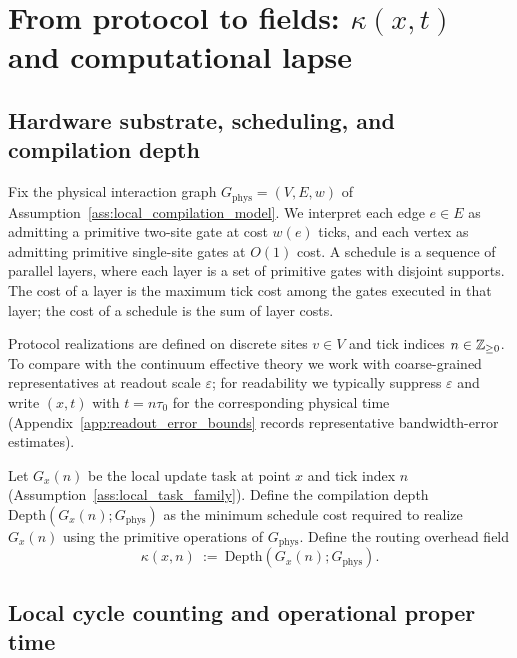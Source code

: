 \section{\texorpdfstring{From protocol to fields: $\kappa(x,t)$ and computational lapse}{From protocol to fields: kappa(x,t) and computational lapse}}
\label{sec:protocol_dictionary}

\subsection{Hardware substrate, scheduling, and compilation depth}
\label{subsec:hardware_depth}

Fix the physical interaction graph $G_{\mathrm{phys}}=(V,E,w)$ of Assumption~\ref{ass:local_compilation_model}.
We interpret each edge $e\in E$ as admitting a primitive two-site gate at cost $w(e)$ ticks, and each vertex as admitting primitive single-site gates at $O(1)$ cost.
A schedule is a sequence of parallel layers, where each layer is a set of primitive gates with disjoint supports.
The cost of a layer is the maximum tick cost among the gates executed in that layer; the cost of a schedule is the sum of layer costs.
\par
\noindent Protocol realizations are defined on discrete sites $v\in V$ and tick indices $n\in\mathbb{Z}_{\ge 0}$.
To compare with the continuum effective theory we work with coarse-grained representatives at readout scale $\varepsilon$; for readability we typically suppress $\varepsilon$ and write $(x,t)$ with $t=n\tau_0$ for the corresponding physical time (Appendix~\ref{app:readout_error_bounds} records representative bandwidth-error estimates).

\begin{definition}
\label{def:compilation_depth}
Let $G_x(n)$ be the local update task at point $x$ and tick index $n$ (Assumption~\ref{ass:local_task_family}).
Define the compilation depth $\mathrm{Depth}(G_x(n);G_{\mathrm{phys}})$ as the minimum schedule cost required to realize $G_x(n)$ using the primitive operations of $G_{\mathrm{phys}}$.
Define the routing overhead field
\begin{equation}
  \kappa(x,n)\ :=\ \mathrm{Depth}(G_x(n);G_{\mathrm{phys}}).
\end{equation}
\end{definition}

\subsection{Local cycle counting and operational proper time}
\label{subsec:cycle_counting}

